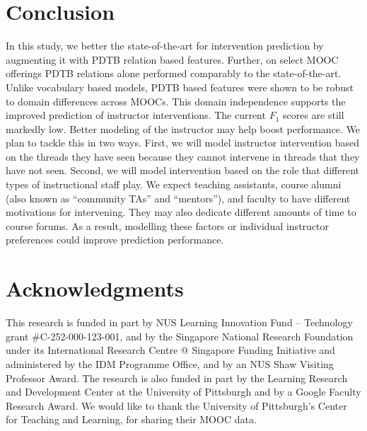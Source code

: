\documentclass[letterpaper]{article}
\begin{document}
\section{Conclusion}
\label{sect:conclusion}
In this study, we better the state-of-the-art for intervention prediction 
by augmenting it with PDTB relation based features. Further, on select MOOC 
offerings PDTB relations alone performed comparably to the state-of-the-art.
Unlike vocabulary based models, PDTB based features were shown to be robust 
to domain differences across MOOCs. This domain independence supports the 
improved prediction of instructor interventions. The current $F_1$ scores are 
still markedly low. Better modeling of the instructor may help boost performance. 
We plan to tackle this in two ways.  First, we will model instructor intervention 
based on the threads they have seen because they cannot intervene in threads that 
they have not seen. Second, we will model intervention based on the role that 
different types of instructional staff play. We expect teaching assistants, course 
alumni (also known as ``community TAs'' and ``mentors''), and faculty to have 
different motivations for intervening. They may also dedicate different amounts 
of time to course forums. As a result, modelling these factors or individual 
instructor preferences could improve prediction performance. 

\section*{Acknowledgments}
This research is funded in part by NUS Learning Innovation Fund --
Technology grant \#C-252-000-123-001, and by the Singapore National
Research Foundation under its International Research Centre @
Singapore Funding Initiative and administered by the IDM Programme
Office, and by an NUS Shaw Visiting Professor Award. The research is also 
funded in part by the Learning Research and Development Center at the 
University of Pittsburgh and by a Google Faculty Research Award. We would like 
to thank the University of Pittsburgh's Center for Teaching and Learning, for 
sharing their MOOC data. 



\end{document}
